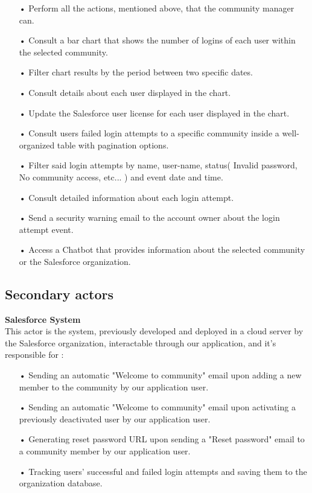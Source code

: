\begin{itemize}
\item[•] Perform all the actions, mentioned above, that the community manager can.
\item[•] Consult a bar chart that shows the number of logins of each user within the selected community.
\item[•] Filter chart results by the period between two specific dates.
\item[•] Consult details about each user displayed in the chart.
\item[•] Update the Salesforce user license for each user displayed in the chart.
\item[•] Consult users failed login attempts to a specific community inside a well-organized table with pagination options.
\item[•] Filter said login attempts by name, user-name, status( Invalid password, No community access, etc... ) and event date and time.
\item[•] Consult detailed information about each login attempt.
\item[•] Send a security warning email to the account owner about the login attempt event.
\item[•] Access a Chatbot that provides information about the selected community or the Salesforce organization.


\end{itemize}
\subsection*{Secondary actors}
\textbf{Salesforce System}\\
This actor is the system, previously developed and deployed in a cloud server by the Salesforce organization, interactable through our application, and it's responsible for :
\begin{itemize}
\item[•] Sending an automatic "Welcome to community" email upon adding a new member to the community by our application user.  
\item[•] Sending an automatic "Welcome to community" email upon activating a previously deactivated user by our application user.
\item[•] Generating reset password URL upon sending a "Reset password" email to a community member by our application user.
\item[•] Tracking users' successful and failed login attempts and saving them to the organization database.

\end{itemize}
